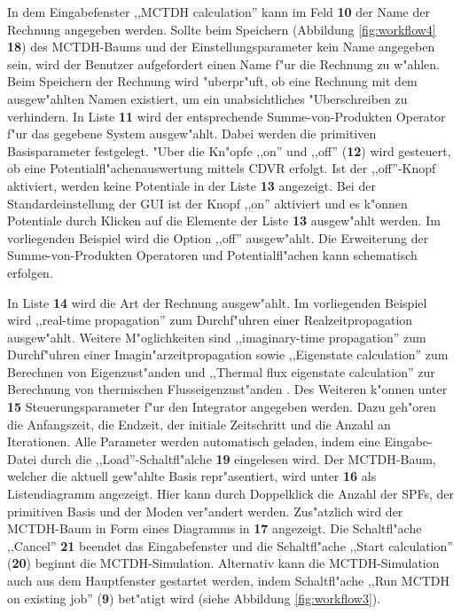 In dem Eingabefenster ,,MCTDH calculation'' kann im Feld \textbf{10} der Name der Rechnung angegeben werden. 
Sollte beim Speichern (Abbildung \ref{fig:workflow4} \textbf{18}) des MCTDH-Baums und der Einstellungsparameter 
kein Name angegeben sein, wird der Benutzer 
aufgefordert einen Name f"ur die Rechnung zu w"ahlen. 
Beim Speichern der Rechnung wird "uberpr"uft, ob eine Rechnung mit dem ausgew"ahlten Namen existiert,
um ein unabsichtliches "Uberschreiben zu verhindern.
In Liste \textbf{11} wird der entsprech\-ende Summe-von-Produkten Operator f"ur das gegebene System ausgew"ahlt.
Dabei werden die primitiven Basisparameter festgelegt.
"Uber die Kn"opfe  ,,on'' und ,,off'' (\textbf{12}) wird gesteuert, ob eine Potentialfl"achenauswertung mittels 
CDVR erfolgt.
Ist der ,,off''-Knopf aktiviert, werden keine Potentiale in der Liste \textbf{13} angezeigt.
Bei der Standardeinstellung der GUI ist der Knopf ,,on'' aktiviert und es k"onnen Potentiale durch Klicken
auf die Elemente der Liste \textbf{13} ausgew"ahlt werden. Im vorliegenden Beispiel wird die Option ,,off''
ausgew"ahlt.
Die Erweiterung der Summe-von-Produkten Operatoren und Potentialfl"achen kann schematisch erfolgen.

In Liste \textbf{14} wird die Art der Rechnung ausgew"ahlt. Im vorliegenden Beispiel wird ,,real-time propagation'' 
zum Durchf"uhren einer Realzeitpropagation ausgew"ahlt.
Weite\-re M"oglichkeiten sind ,,imaginary-time propagation'' zum Durchf"uhren einer Imagin"arzeitpropagation 
sowie ,,Eigenstate calculation'' zum Berechnen von Eigenzust"anden und 
,,Thermal flux eigenstate calculation'' zur Berechnung von thermischen Flusseigenzust"an\-den \cite{thermalflux}.
Des Weiteren k"onnen unter \textbf{15} Steuerungsparameter f"ur den Integrator angegeben werden. Dazu geh"oren die Anfangszeit, die Endzeit,
der initiale Zeitschritt und die Anzahl an Iterationen. 
Alle Parameter werden automatisch geladen, indem eine Eingabe-Datei durch 
die ,,Load''-Schaltfl"alche \textbf{19} eingelesen wird. 
Der MCTDH-Baum, welcher die aktuell gew"ahlte Basis repr"asentiert, wird unter \textbf{16} 
als Listendiagramm angezeigt. Hier
kann durch Doppelklick die Anzahl der SPFs, der primitiven Basis und der Mo\-den ver"andert werden.
Zus"atzlich wird der MCTDH-Baum in Form eines Diagramms in \textbf{17} angezeigt. 
Die Schaltfl"ache ,,Cancel'' \textbf{21} beendet das Eingabefenster
und die Schaltfl"ache ,,Start calculation'' (\textbf{20}) beginnt die MCTDH-Simulation.
Alternativ kann die MCTDH-Simulation auch aus dem Hauptfenster gestartet werden,
indem Schaltfl"ache ,,Run MCTDH on existing job'' (\textbf{9}) bet"atigt wird (siehe Abbildung \ref{fig:workflow3}).

